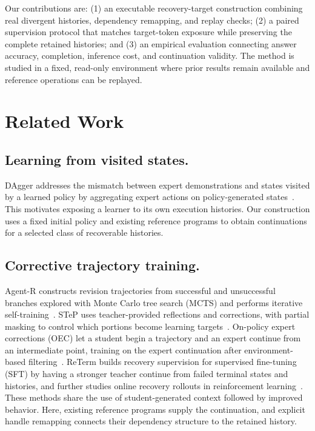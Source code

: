 Our contributions are: (1) an executable recovery-target construction combining real divergent histories, dependency remapping, and replay checks; (2) a paired supervision protocol that matches target-token exposure while preserving the complete retained histories; and (3) an empirical evaluation connecting answer accuracy, completion, inference cost, and continuation validity. The method is studied in a fixed, read-only environment where prior results remain available and reference operations can be replayed.

\section{Related Work}

\subsection{Learning from visited states.}
DAgger addresses the mismatch between expert demonstrations and states visited by a learned policy by aggregating expert actions on policy-generated states~\cite{ross2011dagger}. This motivates exposing a learner to its own execution histories. Our construction uses a fixed initial policy and existing reference programs to obtain continuations for a selected class of recoverable histories.

\subsection{Corrective trajectory training.}
Agent-R constructs revision trajectories from successful and unsuccessful branches explored with Monte Carlo tree search (MCTS) and performs iterative self-training~\cite{yuan2025agentr}. STeP uses teacher-provided reflections and corrections, with partial masking to control which portions become learning targets~\cite{chen2025step}. On-policy expert corrections (OEC) let a student begin a trajectory and an expert continue from an intermediate point, training on the expert continuation after environment-based filtering~\cite{lauffer2025oec}. ReTerm builds recovery supervision for supervised fine-tuning (SFT) by having a stronger teacher continue from failed terminal states and histories, and further studies online recovery rollouts in reinforcement learning~\cite{xie2026reterm}. These methods share the use of student-generated context followed by improved behavior. Here, existing reference programs supply the continuation, and explicit handle remapping connects their dependency structure to the retained history.

